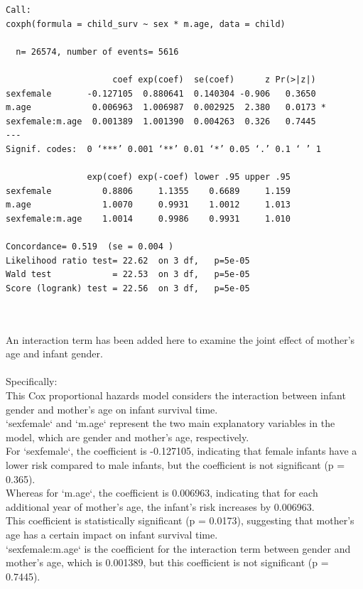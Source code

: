 \documentclass[12pt,letterpaper]{article}
\begin{document}

\begin{verbatim}
Call:
coxph(formula = child_surv ~ sex * m.age, data = child)

  n= 26574, number of events= 5616 

                     coef exp(coef)  se(coef)      z Pr(>|z|)  
sexfemale       -0.127105  0.880641  0.140304 -0.906   0.3650  
m.age            0.006963  1.006987  0.002925  2.380   0.0173 *
sexfemale:m.age  0.001389  1.001390  0.004263  0.326   0.7445  
---
Signif. codes:  0 ‘***’ 0.001 ‘**’ 0.01 ‘*’ 0.05 ‘.’ 0.1 ‘ ’ 1

                exp(coef) exp(-coef) lower .95 upper .95
sexfemale          0.8806     1.1355    0.6689     1.159
m.age              1.0070     0.9931    1.0012     1.013
sexfemale:m.age    1.0014     0.9986    0.9931     1.010

Concordance= 0.519  (se = 0.004 )
Likelihood ratio test= 22.62  on 3 df,   p=5e-05
Wald test            = 22.53  on 3 df,   p=5e-05
Score (logrank) test = 22.56  on 3 df,   p=5e-05
\end{verbatim}
\\\\
An interaction term has been added here to examine the joint effect of mother's age and infant gender. \\\\
Specifically:\\
This Cox proportional hazards model considers the interaction between infant gender and mother's age on infant survival time.\\
`sexfemale` and `m.age` represent the two main explanatory variables in the model, which are gender and mother's age, respectively.\\
For `sexfemale`, the coefficient is -0.127105, indicating that female infants have a lower risk compared to male infants, but the coefficient is not significant (p = 0.365).\\
Whereas for `m.age`, the coefficient is 0.006963, indicating that for each additional year of mother's age, the infant's risk increases by 0.006963.\\
This coefficient is statistically significant (p = 0.0173), suggesting that mother's age has a certain impact on infant survival time.\\
`sexfemale:m.age` is the coefficient for the interaction term between gender and mother's age, which is 0.001389, but this coefficient is not significant (p = 0.7445).\\
\end{document}
